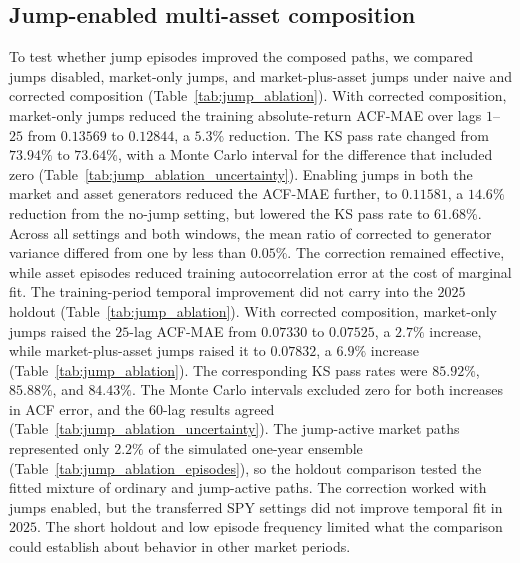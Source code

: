 


\subsection{Jump-enabled multi-asset composition}
\label{sec:results-jump-composition}

To test whether jump episodes improved the composed paths, we compared
jumps disabled, market-only jumps, and market-plus-asset jumps under
naive and corrected composition (Table~\ref{tab:jump_ablation}).
With corrected composition, market-only jumps reduced the training
absolute-return ACF-MAE over lags $1$--$25$ from $0.13569$ to
$0.12844$, a $5.3\%$ reduction. The KS pass rate changed from
$73.94\%$ to $73.64\%$, with a Monte Carlo interval for the difference
that included zero (Table~\ref{tab:jump_ablation_uncertainty}).
Enabling jumps in both the market and asset generators reduced the
ACF-MAE further, to $0.11581$, a $14.6\%$ reduction from the no-jump
setting, but lowered the KS pass rate to $61.68\%$. Across all settings
and both windows, the mean ratio of corrected to generator variance
differed from one by less than $0.05\%$. The correction remained effective,
while asset episodes reduced training autocorrelation error at the
cost of marginal fit.
The training-period temporal improvement did not carry into the
$2025$ holdout (Table~\ref{tab:jump_ablation}). With corrected composition, market-only jumps raised
the $25$-lag ACF-MAE from $0.07330$ to $0.07525$, a $2.7\%$
increase, while market-plus-asset jumps raised it to $0.07832$, a
$6.9\%$ increase (Table~\ref{tab:jump_ablation}). The corresponding
KS pass rates were $85.92\%$, $85.88\%$, and $84.43\%$.
The Monte Carlo intervals excluded zero for both increases in ACF
error, and the $60$-lag results agreed
(Table~\ref{tab:jump_ablation_uncertainty}). The jump-active market
paths represented only $2.2\%$ of the simulated one-year ensemble
(Table~\ref{tab:jump_ablation_episodes}), so the holdout comparison tested the fitted mixture of ordinary and
jump-active paths. The correction worked with jumps enabled, but the transferred SPY
settings did not improve temporal fit in $2025$. The short holdout
and low episode frequency limited what the comparison could establish
about behavior in other market periods.

